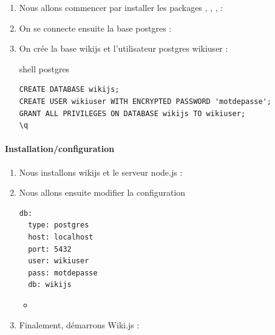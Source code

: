 \documentclass{article}
\begin{document}
\begin{enumerate}
	\item Nous allons commencer par installer les packages , ,  ,  :
	\item On se connecte ensuite la base postgres : 
	\item On crée la base wikijs et l'utilisateur postgres wikiuser :
	\begin{codebox}{shell postgres}
\begin{lstlisting}
CREATE DATABASE wikijs;
CREATE USER wikiuser WITH ENCRYPTED PASSWORD 'motdepasse';
GRANT ALL PRIVILEGES ON DATABASE wikijs TO wikiuser;
\q
\end{lstlisting}
\end{codebox}
\end{enumerate}

\paragraph{Installation/configuration\\}
\begin{enumerate}
	\item Nous installons wikijs et le serveur node.js :
	
	\item Nous allons ensuite modifier la configuration 
	\begin{configbox}{}
	\begin{lstlisting}
db:
  type: postgres
  host: localhost
  port: 5432
  user: wikiuser
  pass: motdepasse
  db: wikijs
	\end{lstlisting}
	\end{configbox}
	\begin{itemize}
		\item {}
	\end{itemize}
	
	\item Finalement, démarrons Wiki.js :
\end{enumerate}
\end{document}
